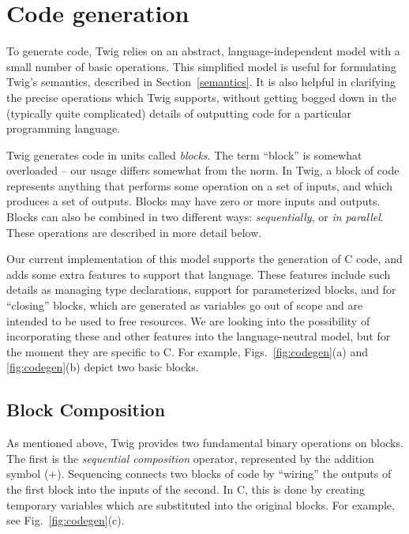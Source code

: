 
\section{Code generation}
\label{sec:code-gen}

To generate code, Twig relies on an abstract, language-independent model with a small number of basic operations. This simplified model is useful for formulating Twig's semantics, described in Section~\ref{semantics}. It is also helpful in clarifying the precise operations which Twig supports, without getting bogged down in the (typically quite complicated) details of outputting code for a particular programming language.

Twig generates code in units called \emph{blocks}. The term ``block'' is somewhat overloaded -- our usage differs somewhat from the norm. In Twig, a block of code represents anything that performs some operation on a set of inputs, and which produces a set of outputs. Blocks may have zero or more inputs and outputs. Blocks can also be combined in two different ways: \emph{sequentially}, or \emph{in parallel}. These operations are described in more detail below.

Our current implementation of this model supports the generation of C code, and adds some extra features to support that language. These features include such details as managing type declarations, support for parameterized blocks, and for ``closing'' blocks, which are generated as variables go out of scope and are intended to be used to free resources. We are looking into the possibility of incorporating these and other features into the language-neutral model, but for the moment they are specific to C. For example, Figs.~\ref{fig:codegen}(a) and \ref{fig:codegen}(b) depict two basic blocks.

\subsection{Block Composition}

As mentioned above, Twig provides two fundamental binary operations on blocks. The first is the \emph{sequential composition} operator, represented by the addition symbol ($+$). Sequencing connects two blocks of code by ``wiring'' the outputs of the first block into the inputs of the second. In C, this is done by creating temporary variables which are substituted into the original blocks. For example, see Fig.~\ref{fig:codegen}(c).

